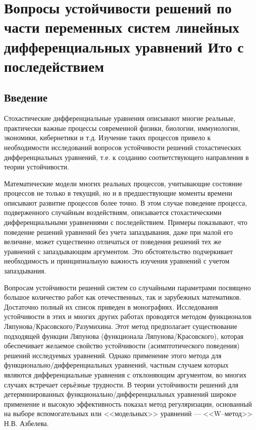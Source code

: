 \chapter{Вопросы устойчивости решений по части переменных систем линейных дифференциальных уравнений Ито с последействием}

\section*{Введение}

Стохастические дифференциальные уравнения
описывают многие реальные, практически важные процессы современной
физики, биологии, иммунологии, экономики, кибернетики и т.д.
Изучение таких процессов привело к необходимости исследований
вопросов устойчивости решений стохастических дифференциальных
уравнений, т.е. к созданию соответствующего направления в теории
устойчивости.

Математические модели многих реальных процессов, учитывающие
состояние процессов не только в текущий, но и в предшествующие
моменты времени описывают развитие процессов более точно. В этом
случае поведение процесса, подверженного случайным воздействиям,
описывается стохастическими дифференциальными уравнениями с
последействием. Примеры показывают, что поведение решений уравнений
без учета запаздывания, даже при малой его величине, может
существенно отличаться от поведения решений тех же уравнений с
запаздывающим аргументом. Это обстоятельство подчеркивает
необходимость и принципиальную важность изучения уравнений с учетом
запаздывания.

Вопросам устойчивости решений систем со случайными параметрами
посвящено \linebreak большое количество работ как отечественных, так и
зарубежных математиков. Достаточно полный их список приведен в
монографиях. Исследования устойчивости в этих и многих других
работах проводятся методом функционалов
Ляпунова\-/Красовского\-/Разумихина. Этот метод предполагает
существование подходящей функции Ляпунова (функционала
Ляпунова\-/Красовского), которая обеспечивает желаемое свойство
устойчивости (асимптотического поведения) решений исследуемых
уравнений. Однако применение этого метода для
функционально\-/дифференциальных уравнений, частным случаем которых
являются дифференциальные уравнения с отклоняющим аргументом, во
многих случаях встречает серьёзные трудности. В теории устойчивости
решений для детерминированных функционально\-/дифференциальных
уравнений широкое применение и высокую эффективность показал метод
регуляризации, основанный на выборе вспомогательных или <<модельных>> уравнений  --- <<W--метод>> Н.В. Азбелева.

